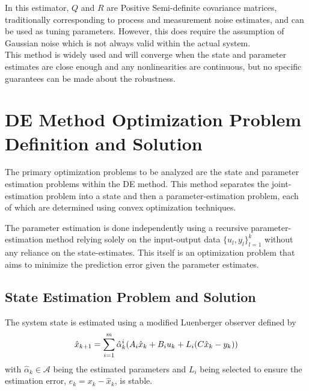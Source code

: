 \documentclass[]{article}
\begin{document}
In this estimator, $Q$ and $R$ are Positive Semi-definite covariance matrices, traditionally corresponding to process and measurement noise estimates, and can be used as tuning parameters. However, this does require the assumption of Gaussian noise which is not always valid within the actual system.\\
This method is widely used and will converge when the state and parameter estimates are close enough and any nonlinearities are continuous, but no specific guarantees can be made about the robustness.




\newpage
\section{DE Method Optimization Problem Definition and Solution \cite{beelen2017joint}} \label{sec:DE_method_opt_pblm}
The primary optimization problems to be analyzed are the state and parameter estimation problems within the DE method. This method separates the joint-estimation problem into a state and then a parameter-estimation problem, each of which are determined using convex optimization techniques.

The parameter estimation is done independently using a recursive parameter-estimation method relying solely on the input-output data $\{u_l , y_l\}_{l=1}^k$ without any reliance on the state-estimates. This itself is an optimization problem that aims to minimize the prediction error given the parameter estimates.

\subsection{State Estimation Problem and Solution}
The system state is estimated using a modified Luenberger observer defined by
\begin{equation} \label{eq:DE_state_observer_form}
	\hat{x}_{k+1} = \sum_{i=1}^m \hat{\alpha}_k^i \qty(A_i \hat{x}_k + B_i u_k + L_i \qty(C \hat{x}_k - y_k))
\end{equation}
with $\hat{\alpha}_k \in \mathcal{A}$ being the estimated parameters and $L_i$ being selected to ensure the estimation error, $e_k = x_k - \hat{x}_k$, is stable.
\end{document}
